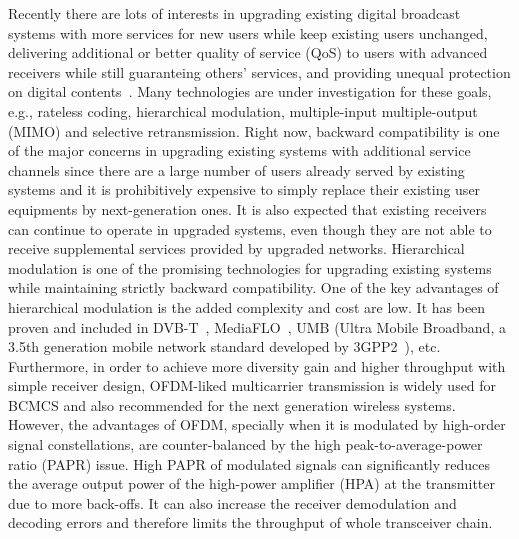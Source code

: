 \documentclass[10pt,fleqn, twocolumn]{IEEEtran}
\begin{document}
Recently there are lots of interests in upgrading existing digital
broadcast systems with more services for new users while keep
existing users unchanged, delivering  additional or better quality
of service (QoS) to users with advanced receivers while still
guaranteing others' services, and providing unequal protection on
digital contents~\cite{DVB,MediaFLO,Jiang05,UMB}. Many
technologies are under investigation for these goals, e.g.,
rateless coding, hierarchical modulation, multiple-input
multiple-output (MIMO) and selective retransmission. Right now,
backward compatibility is one of the major concerns in upgrading
existing systems with additional service channels since there are
a large number of users already served by existing systems and it
is prohibitively expensive to simply replace their existing user
equipments by next-generation ones. It is also expected that
existing receivers can continue to operate in upgraded systems,
even though they are not able to receive supplemental services
provided by upgraded networks. Hierarchical modulation is one of
the promising technologies for upgrading existing systems while
maintaining strictly backward compatibility. One of the key
advantages of hierarchical modulation is the added complexity and
cost are low. It has been proven and included in DVB-T~\cite{DVB},
MediaFLO~\cite{MediaFLO}, UMB (Ultra Mobile Broadband, a 3.5th
generation mobile network standard developed by 3GPP2~\cite{UMB}),
etc. Furthermore, in order to achieve more diversity gain and
higher throughput with simple receiver design, OFDM-liked
multicarrier transmission is widely used for BCMCS and also
recommended for the next generation wireless systems. However, the
advantages of OFDM, specially when it is modulated by high-order
signal constellations, are counter-balanced by the high
peak-to-average-power ratio (PAPR) issue. High PAPR of modulated
signals can significantly reduces  the average output power of the
high-power amplifier (HPA) at the transmitter due to more
back-offs. It can also increase the receiver demodulation and
decoding errors and therefore limits the throughput of whole
transceiver chain.
\end{document}
